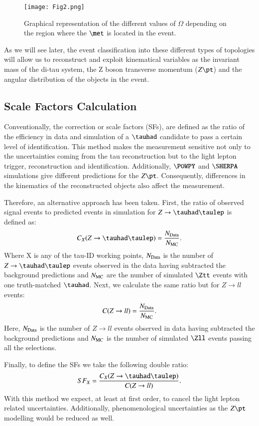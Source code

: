 \begin{figure}[htbp]
	\centering
	\texttt{[image: Fig2.png]}
	\caption{Graphical representation of the different values of $\Omega$ depending on the region where the $\met$ is located in the event.}
	\label{Fig2}
\end{figure}
As we will see later, the event classification into these different types of topologies will allow us to reconstruct and exploit kinematical variables as the invariant mass of the di-tau system, the Z boson transverse momentum ($Z\pt$) and the angular distribution of the objects in the event.

\subsection{Scale Factors Calculation}
Conventionally, the correction or scale factors (SFs), are defined as the ratio of the efficiency in data and simulation of a $\tauhad$ candidate to pass a certain level of identification. This method makes the measurement sensitive not only to the uncertainties coming from the tau reconstruction but to the light lepton trigger, reconstruction and identification. Additionally, $\POWPY$ and $\SHERPA$ simulations give different predictions for the $Z\pt$. Consequently, differences in the kinematics of the reconstructed objects also affect the measurement.

Therefore, an alternative approach has been taken. First, the ratio of observed signal events to predicted events in simulation for $Z\to\tauhad\taulep$ is defined as:
\begin{equation}
	C_{X}(Z\to\tauhad\taulep)=\frac{\NData}{\NMC}.
\end{equation}
Where X is any of the tau-ID working points, $N_{\text{Data}}$ is the number of $Z\to\tauhad\taulep$ events observed in the data having subtracted the background predictions and $N_{\text{MC}}$ are the number of simulated $\Ztt$ events with one truth-matched $\tauhad$. Next, we calculate the same ratio but for $Z\to ll$ events:
\begin{equation}
C(Z\to ll)=\frac{N_{\text{Data}}}{N_{\text{MC}}}.
\end{equation}
Here, $N_{\text{Data}}$ is the number of $Z\to ll$ events observed in data having subtracted the background predictions and $N_{\text{MC}}$ is the number of simulated $\Zll$ events passing all the selections.

Finally, to define the SFs we take the following double ratio:
\begin{equation}
SF_{X}=\frac{C_{X}(Z\to\tauhad\taulep)}{C(Z\to ll)}.
\end{equation}
With this method we expect, at least at first order, to cancel the light lepton related uncertainties. Additionally, phenomenological uncertainties as the $Z\pt$ modelling would be reduced as well.
